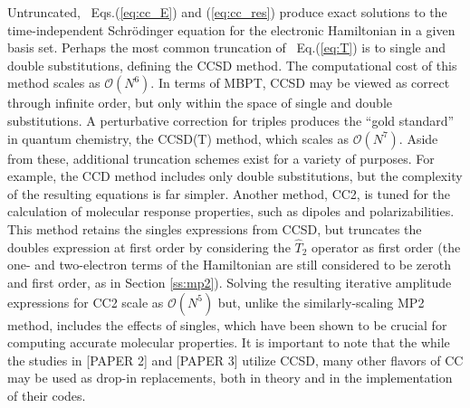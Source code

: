 Untruncated, ~Eqs.(\ref{eq:cc_E}) and (\ref{eq:cc_res}) produce exact solutions to the time-independent 
Schr\"odinger equation for the electronic Hamiltonian in a given basis set. Perhaps the most common 
truncation of ~Eq.(\ref{eq:T}) is to single and double substitutions, defining the CCSD method. 
The computational cost of this method scales as $\mathcal{O}(N^6)$. In terms of MBPT, CCSD may be viewed 
as correct through infinite order, but only within the space of single and double substitutions.
A perturbative correction for triples produces the ``gold standard'' in quantum chemistry, 
the CCSD(T) method, which scales as $\mathcal{O}(N^7)$. Aside from these, additional truncation schemes exist 
for a variety of purposes. For example, the CCD method includes only double substitutions, but the 
complexity of the resulting equations is far simpler. Another method, CC2, is tuned for the calculation
of molecular response properties, such as dipoles and polarizabilities. This method retains the singles
expressions from CCSD, but truncates the doubles expression at first order by considering the $\hat{T}_2$ 
operator as first order (the one- and two-electron terms of the Hamiltonian are still considered to be
zeroth and first order, as in Section \ref{ss:mp2}). Solving the resulting iterative amplitude expressions 
for CC2
scale as $\mathcal{O}(N^5)$ but, unlike the similarly-scaling MP2 method, includes the effects of singles, 
which have been shown to be crucial for computing accurate molecular properties. 
It is important to note that the while the studies in [PAPER 2] and [PAPER 3] utilize CCSD, 
many other flavors of CC may be used as drop-in replacements, both in theory and in the implementation 
of their codes. 

